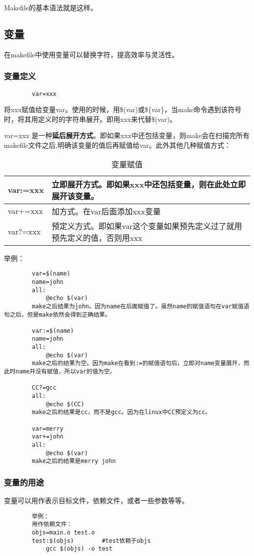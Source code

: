 \documentclass{article}
\begin{document}
\begin{CJK}{UTF8}{gbsn}
	Makefile的基本语法就是这样。
	\subsection{变量}
	在makefile中使用变量可以替换字符，提高效率与灵活性。
	\subsubsection{变量定义}
	\begin{verbatim}
		var=xxx
	\end{verbatim}
	\par
		将xxx赋值给变量var。使用的时候，用\$(var)或\$\{var\}，当make命令遇到该符号时，将其用定义时的字符串展开。即用xxx来代替\$(var)。
	\par
		var=xxx 是一种\textbf{延后展开方式}。即如果xxx中还包括变量，则make会在扫描完所有makefile文件之后,明确该变量的值后再赋值给var。此外其他几种赋值方式：\\
		\begin{table}[!htp]
		\begin{tabular}[t]{l|l}
		\hline
		var:=xxx & 立即展开方式。即如果xxx中还包括变量，则在此处立即展开该变量。\\
		\hline
		var+=xxx & 加方式。在var后面添加xxx变量\\
		\hline
		var?=xxx & 预定义方式。即如果var这个变量如果预先定义过了就用预先定义的值，否则用xxx\\
		\hline
		\end{tabular}
			\caption{变量赋值}
		\end{table}	
		\newline
		举例：
	\begin{verbatim}
		var=$(name)
		name=john
		all:
		    @echo $(var)
		make之后结果为john。因为name在后面赋值了。虽然name的赋值语句在var赋值语句之后，但是make依然会得到正确结果。

		var:=$(name)
		name=john
		all:
		    @echo $(var)
		make之后的结果为空。因为make在看到:=的赋值语句后，立即对name变量展开，而此时name并没有赋值，所以var的值为空。

		CC?=gcc
		all:
		    @echo $(CC)
		make之后的结果是cc，而不是gcc。因为在linux中CC预定义为cc。

		var=merry
		var+=john
		all:
		    @echo $(var)
		make之后的结果是merry john 
	\end{verbatim}
	\subsubsection{变量的用途}
		变量可以用作表示目标文件，依赖文件，或者一些参数等等。
	\begin{verbatim}
		举例：
		用作依赖文件：
		objs=main.o test.o 
		test:$(objs)		#test依赖于objs
		    gcc $(objs) -o test


\end{verbatim}
\end{CJK}
\end{document}
